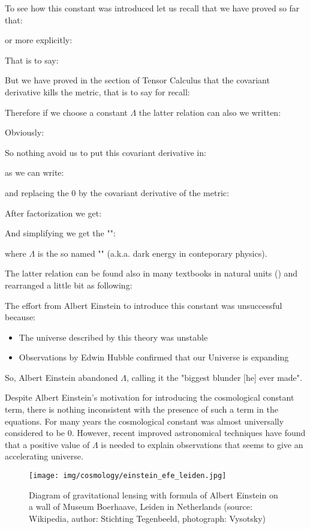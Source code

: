 	To see how this constant was introduced let us recall that we have proved so far that:
	
	or more explicitly:
	
	That is to say:
	
	But we have proved in the section of Tensor Calculus that the covariant derivative kills the metric, that is to say for recall:
	
	Therefore if we choose a constant $\Lambda$ the latter relation can also we written:
	
	Obviously:
	
	So nothing avoid us to put this covariant derivative in:
	
	as we can write:
	
	and replacing the $0$ by the covariant derivative of the metric:
	
	After factorization we get:
	
	And simplifying we get the "":
	
	where $\Lambda$ is the so named "" (a.k.a. dark energy in conteporary physics).
	
	The latter relation can be found also in many textbooks in natural units () and rearranged a little bit as following:
	
	The effort from Albert Einstein to introduce this constant was unsuccessful because:
	\begin{itemize}
		\item The universe described by this theory was unstable
		\item Observations by Edwin Hubble confirmed that our Universe is expanding
	\end{itemize}
	So, Albert Einstein abandoned $\Lambda$, calling it the "biggest blunder [he] ever made".

		Despite Albert Einstein's motivation for introducing the cosmological constant term, there is nothing inconsistent with the presence of such a term in the equations. For many years the cosmological constant was almost universally considered to be $0$. However, recent improved astronomical techniques have found that a positive value of $\Lambda$  is needed to explain observations that seems to give an accelerating universe.	
	\begin{figure}[H]
		\centering
		\texttt{[image: img/cosmology/einstein\_efe\_leiden.jpg]}	
		\caption[]{Diagram of gravitational lensing  with formula of Albert Einstein on a wall of Museum Boerhaave, Leiden in Netherlands (source: Wikipedia, author: Stichting Tegenbeeld,  photograph: Vysotsky)}
	\end{figure}
	
